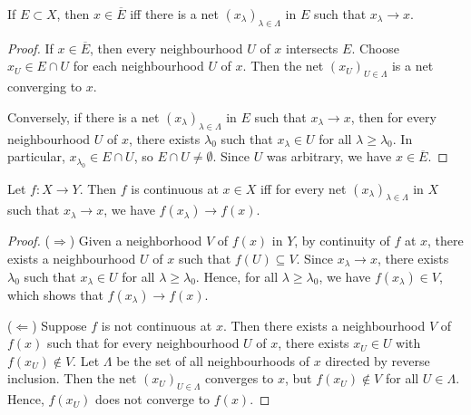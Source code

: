 \begin{theorem}
    If $E\subset X$, then $x\in\overline{E}$ iff there is a net $(x_\lambda)_{\lambda\in\Lambda}$ in $E$ such that $x_\lambda\to x$.
\end{theorem}
\begin{proof}
    If $x\in \overline{E}$, then every neighbourhood $U$ of $x$ intersects $E$. Choose $x_U\in E\cap U$ for each neighbourhood $U$ of $x$. Then the net $(x_U)_{U\in\Lambda}$ is a net converging to $x$.

    Conversely, if there is a net $(x_\lambda)_{\lambda\in\Lambda}$ in $E$ such that $x_\lambda\to x$, then for every neighbourhood $U$ of $x$, there exists $\lambda_0$ such that $x_\lambda\in U$ for all $\lambda\ge \lambda_0$. In particular, $x_{\lambda_0}\in E\cap U$, so $E\cap U\neq \emptyset$. Since $U$ was arbitrary, we have $x\in \overline{E}$.
\end{proof}

\begin{theorem}
    Let $f:X\to Y$. Then $f$ is continuous at $x\in X$ iff for every net $(x_\lambda)_{\lambda\in\Lambda}$ in $X$ such that $x_\lambda\to x$, we have $f(x_\lambda)\to f(x)$.
\end{theorem}
\begin{proof}
    ($\Rightarrow$) Given a neighborhood $V$ of $f(x)$ in $Y$, by continuity of $f$ at $x$, there exists a neighbourhood $U$ of $x$ such that $f(U)\subseteq V$. Since $x_\lambda\to x$, there exists $\lambda_0$ such that $x_\lambda\in U$ for all $\lambda\ge \lambda_0$. Hence, for all $\lambda\ge \lambda_0$, we have $f(x_\lambda)\in V$, which shows that $f(x_\lambda)\to f(x)$.

    ($\Leftarrow$) Suppose $f$ is not continuous at $x$. Then there exists a neighbourhood $V$ of $f(x)$ such that for every neighbourhood $U$ of $x$, there exists $x_U\in U$ with $f(x_U)\notin V$. Let $\Lambda$ be the set of all neighbourhoods of $x$ directed by reverse inclusion. Then the net $(x_U)_{U\in\Lambda}$ converges to $x$, but $f(x_U)\notin V$ for all $U\in\Lambda$. Hence, $f(x_U)$ does not converge to $f(x)$.
\end{proof}





\newpage
